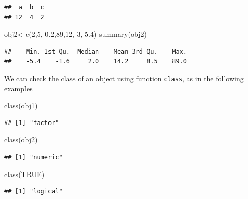 \documentclass[
]{article}
\newenvironment{Shaded}{\begin{snugshade}}{\end{snugshade}}
\newcommand{\ConstantTok}[1]{\textcolor[rgb]{0.00,0.00,0.00}{#1}}
\newcommand{\DecValTok}[1]{\textcolor[rgb]{0.00,0.00,0.81}{#1}}
\newcommand{\FloatTok}[1]{\textcolor[rgb]{0.00,0.00,0.81}{#1}}
\newcommand{\FunctionTok}[1]{\textcolor[rgb]{0.00,0.00,0.00}{#1}}
\newcommand{\NormalTok}[1]{#1}
\newcommand{\OtherTok}[1]{\textcolor[rgb]{0.56,0.35,0.01}{#1}}
\newcommand{\SpecialCharTok}[1]{\textcolor[rgb]{0.00,0.00,0.00}{#1}}
\begin{document}
\begin{verbatim}
##  a  b  c 
## 12  4  2
\end{verbatim}

\begin{Shaded}
\begin{Highlighting}[]
\NormalTok{obj2}\OtherTok{\textless{}{-}}\FunctionTok{c}\NormalTok{(}\DecValTok{2}\NormalTok{,}\DecValTok{5}\NormalTok{,}\SpecialCharTok{{-}}\FloatTok{0.2}\NormalTok{,}\DecValTok{89}\NormalTok{,}\DecValTok{12}\NormalTok{,}\SpecialCharTok{{-}}\DecValTok{3}\NormalTok{,}\SpecialCharTok{{-}}\FloatTok{5.4}\NormalTok{)}
\FunctionTok{summary}\NormalTok{(obj2)}
\end{Highlighting}
\end{Shaded}

\begin{verbatim}
##    Min. 1st Qu.  Median    Mean 3rd Qu.    Max. 
##    -5.4    -1.6     2.0    14.2     8.5    89.0
\end{verbatim}

We can check the class of an object using function \texttt{class}, as in
the following examples

\begin{Shaded}
\begin{Highlighting}[]
\FunctionTok{class}\NormalTok{(obj1)}
\end{Highlighting}
\end{Shaded}

\begin{verbatim}
## [1] "factor"
\end{verbatim}

\begin{Shaded}
\begin{Highlighting}[]
\FunctionTok{class}\NormalTok{(obj2)}
\end{Highlighting}
\end{Shaded}

\begin{verbatim}
## [1] "numeric"
\end{verbatim}

\begin{Shaded}
\begin{Highlighting}[]
\FunctionTok{class}\NormalTok{(}\ConstantTok{TRUE}\NormalTok{)}
\end{Highlighting}
\end{Shaded}

\begin{verbatim}
## [1] "logical"
\end{verbatim}
\end{document}
